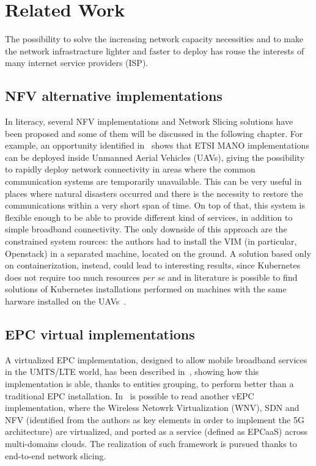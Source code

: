 \chapter{Related Work}
\label{chap:rel_wk}


The possibility to solve the increasing network capacity necessities and to make
the network infrastracture lighter and faster to deploy has rouse the interests
of many internet service providers (ISP).

\section{NFV alternative implementations}

In literacy, several NFV implementations and Network Slicing solutions have been
proposed and some of them will be discussed in the following chapter. For
example, an opportunity identified in~\cite{nogales2018nfv} shows that ETSI MANO
implementations can be deployed inside Unmanned Aerial Vehicles (UAVs), giving
the possibility to rapidly deploy network connectivity in areas where the common
communication systems are temporarily unavailable. This can be very useful in
places where natural disasters occurred and there is the necessity to restore
the communications within a very short span of time. On top of that, this system
is flexible enough to be able to provide different kind of services, in addition
to simple broadband connectivity. The only downside of this approach are the
constrained system rources: the authors had to install the VIM (in particular,
Openstack) in a separated machine, located on the ground. A solution based only
on containerization, instead, could lead to interesting results, since
Kubernetes does not require too much resources \textit{per se} and in literature
is possible to find solutions of Kubernetes installations performed on machines
with the same harware installed on the UAVs~\cite{pahl2016container}.

\section{EPC virtual implementations}

A virtualized EPC implementation, designed to allow mobile broadband services in
the UMTS/LTE world, has been described in~\cite{hawilo2014nfv}, showing how this
implementation is able, thanks to entities grouping, to perform better than a
traditional EPC installation. In~\cite{afolabi2017end} is possible to read
another vEPC implementation, where the Wireless Netowrk Virtualization (WNV),
SDN and NFV (identified from the authors as key elements in order to implement
the 5G architecture) are virtualized, and ported as a service (defined as
EPCaaS) across multi-domains clouds. The realization of such framework is
pursued thanks to end-to-end network slicing.

